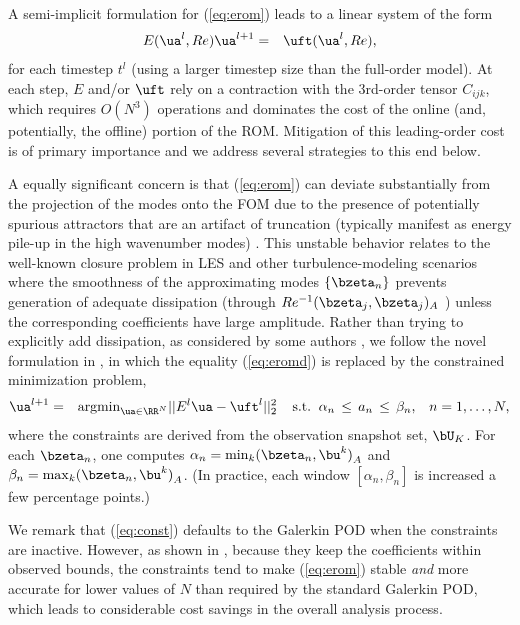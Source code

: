    A semi-implicit formulation
for (\ref{eq:erom}) leads to a linear system of the form
\begin{eqnarray} \label{eq:eromd}
E(\ua^l,Re) \ua^{l+1} &=& \uft (\ua^l,Re),
\end{eqnarray}
for each timestep $t^l$ (using a larger timestep size than the full-order model).
At each step, $E$ and/or $\uft$ rely on a contraction with the 3rd-order tensor 
$C_{ijk}$, which requires $O(N^3)$ operations and dominates the cost of the online (and,
potentially, the offline) portion of the ROM.  Mitigation of this leading-order
cost is of primary importance and we address several strategies to this end below.

A equally significant concern is that (\ref{eq:erom}) can deviate substantially
from the projection of the modes onto the FOM due to the presence of potentially
spurious attractors that are an artifact of truncation (typically manifest as
energy pile-up in the high wavenumber modes)  \cite{fick18,rempfer00}.  This
unstable behavior relates to the well-known closure problem in LES and other
turbulence-modeling scenarios where the smoothness of the approximating modes
$\{\bzeta_n\}$ prevents generation of adequate dissipation (through $Re^{-1}
(\bzeta_j,\bzeta_j)_A$ ) unless the corresponding coefficients have large
amplitude.  Rather than trying to explicitly add dissipation, as considered by
some authors \cite{lumley88}, we follow the novel formulation in \cite{fick18},
in which the equality (\ref{eq:eromd}) is replaced by the constrained
minimization problem, \\[-3ex]
\begin{eqnarray} \label{eq:const}
\ua^{l+1} &=& \mbox{argmin}_{\ua \in \RR^N} || E^l \ua - \uft^l ||_2^2
\;\;\;\;\mbox{s.t.} \;\; \alpha_n \, \leq \, a_n \, \leq \, \beta_n,\;\;\; n=1,\dots,N,
\end{eqnarray}
where the constraints are derived from the observation snapshot set, $\bU_K$.
For each $\bzeta_n$, one computes $\alpha_n = \min_k (\bzeta_n,\bu^k)^{}_A$ and
$\beta_n = \max_k (\bzeta_n , \bu^k)^{}_A$.  (In practice, each window 
$[\alpha_n,\beta_n]$ is increased a few percentage points.)  

  We remark that (\ref{eq:const}) defaults to the Galerkin POD when the
constraints are inactive.  However, as shown in \cite{fick18}, because
they keep the coefficients within observed bounds, the constraints tend to
make (\ref{eq:erom}) stable {\em and} more accurate for lower values of $N$
than required by the standard Galerkin POD, which leads to considerable cost
savings in the overall analysis process.  

